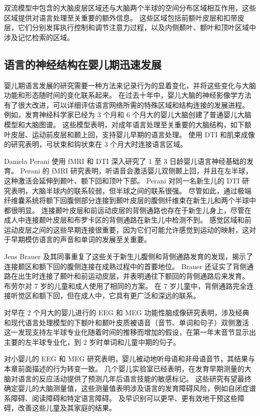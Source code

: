 双流模型中包含的大脑皮层区域还与大脑两个半球的空间分布区域相互作用，这些区域提供对语言处理至关重要的额外信息。 这些区域包括前额叶皮层和扣带皮层，它们分别发挥执行控制和调节注意力过程，以及内侧颞叶、额叶和顶叶区域中涉及记忆检索的区域。



\subsection{语言的神经结构在婴儿期迅速发展}
婴儿期语言发展的研究需要一种方法来记录行为的显着变化，并将这些变化与大脑功能和形态随时间的变化联系起来。 在过去十年中，婴儿大脑的神经影像学方法有了很大改进，可以详细评估语言网络所需的特殊区域和结构连接的发展进程。 例如，发育神经科学家已经为 3 个月和 6 个月大的婴儿大脑创建了普通婴儿大脑模型和大脑图谱。 这些模型表明，对成年语言处理至关重要的大脑结构，如下额叶皮层、运动前皮层和颞上回，支持婴儿早期的语言处理。 使用 DTI 和肌束成像的研究表明，弓状束和钩状束在 3 个月大时连接语言区域。

Daniela Perani 使用 fMRI 和 DTI 深入研究了 1 至 3 日龄婴儿语言神经基础的发育。 Perani 的 fMRI 研究表明，听语音会激活婴儿双侧颞上回，并且在左半球，这种激活会延伸到颞叶、额下回和顶叶下部。 Perani 对同一名新生儿的 DTI 研究表明，大脑半球内的联系较弱，但半球之间的联系很强。 尽管如此，通过极端纤维囊系统将额下回腹侧部分连接到颞叶皮层的腹侧纤维束在新生儿和两个半球中都很明显。 连接颞叶皮层和前运动皮层的背侧通路也存在于新生儿身上，尽管在成人中连接颞叶皮层和布罗卡区的背侧通路在新生儿中检测不到。 感觉区域和前运动皮层之间的这些早期连接很重要，因为它们可能允许感觉到运动的映射，这对于早期模仿语言的声音和单词的发展至关重要。

Jens Brauer 及其同事重复了这些关于新生儿腹侧和背侧通路发育的发现，揭示了连接颞区和额下回的腹侧连接在成熟过程中的首要地位。 Brauer 还证实了背侧通路在出生时连接了颞叶和前运动皮层，并表明通往下额回的背侧通路后来发育。 布劳尔对 7 岁的儿童和成人使用了相同的方案。 在 7 岁儿童中，背侧通路完全连接听觉区和额下回，但在成人中，它具有更广泛和深远的联系。

对早在 2 个月大的婴儿进行的 EEG 和 MEG 功能性脑成像研究表明，涉及经典和现代语言处理模型的下额叶和颞叶皮质被语音（音节、单词和句子）双侧激活 . 这一发现支持左半球专业化随着时间的推移而增加的假设，在第一年末音节显示出主要的左半球专业化，到 2 岁时单词和儿童中期的句子。

对小婴儿的 EEG 和 MEG 研究表明，婴儿被动地听母语和非母语音节，其结果与本章前面描述的行为转变一致。 几个婴儿实验室已经表明，在发育早期测量的大脑对语言的反应活动提供了预测几年后语言技能的敏感标记。 这些研究有望最终确定婴儿的大脑测量值，这些测量值表明涉及语言的发育障碍风险，例如自闭症谱系障碍、阅读障碍和特定语言障碍。 及早识别可以更早、更有效地干预这些障碍，改善这些儿童及其家庭的结果。


